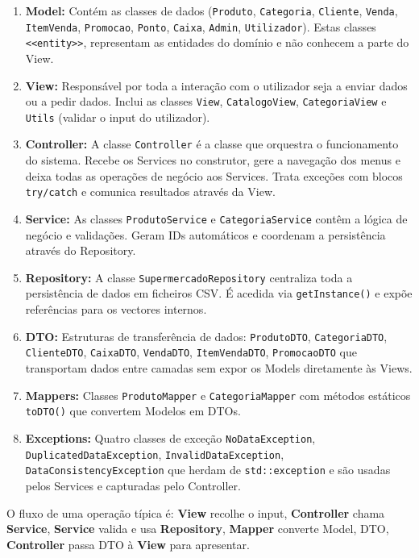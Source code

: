 \documentclass[a4paper]{llncs}
\begin{document}
\begin{enumerate}
    \item \textbf{Model:} Contém as classes de dados (\texttt{Produto}, \texttt{Categoria}, \texttt{Cliente}, \texttt{Venda}, \texttt{ItemVenda}, \texttt{Promocao}, \texttt{Ponto}, \texttt{Caixa}, \texttt{Admin}, \texttt{Utilizador}). Estas classes \texttt{<<entity>>}, representam as entidades do domínio e não conhecem a parte do View.
    \item \textbf{View:} Responsável por toda a interação com o utilizador seja a enviar dados ou a pedir dados. Inclui as classes \texttt{View}, \texttt{CatalogoView}, \texttt{CategoriaView} e \texttt{Utils} (validar o input do utilizador).
    \item \textbf{Controller:} A classe \texttt{Controller} é a classe que orquestra o funcionamento do sistema. Recebe os Services no construtor, gere a navegação dos menus e deixa todas as operações de negócio aos Services. Trata exceções com blocos \texttt{try/catch} e comunica resultados através da View.
    \item \textbf{Service:} As classes \texttt{ProdutoService} e \texttt{CategoriaService}  contêm a lógica de negócio e validações. Geram IDs automáticos e coordenam a persistência através do Repository.
    \item \textbf{Repository:} A classe \texttt{SupermercadoRepository}  centraliza toda a persistência de dados em ficheiros CSV. É acedida via \texttt{getInstance()} e expõe referências para os vectores internos.
    \item \textbf{DTO:} Estruturas de transferência de dados: \texttt{ProdutoDTO}, \texttt{CategoriaDTO}, \texttt{ClienteDTO}, \texttt{CaixaDTO}, \texttt{VendaDTO}, \texttt{ItemVendaDTO}, \texttt{PromocaoDTO} que transportam dados entre camadas sem expor os Models diretamente às Views.
    \item \textbf{Mappers:} Classes \texttt{ProdutoMapper} e \texttt{CategoriaMapper} com métodos estáticos \texttt{toDTO()} que convertem Modelos em DTOs.
    \item \textbf{Exceptions:} Quatro classes de exceção \texttt{NoDataException}, \texttt{DuplicatedDataException}, \texttt{InvalidDataException}, \texttt{DataConsistencyException} que herdam de \texttt{std::exception} e são usadas pelos Services e capturadas pelo Controller.
\end{enumerate}

O fluxo de uma operação típica é: \textbf{View} recolhe o input, \textbf{Controller} chama \textbf{Service}, \textbf{Service} valida e usa \textbf{Repository}, \textbf{Mapper} converte Model, DTO, \textbf{Controller} passa DTO à \textbf{View} para apresentar.
\end{document}
